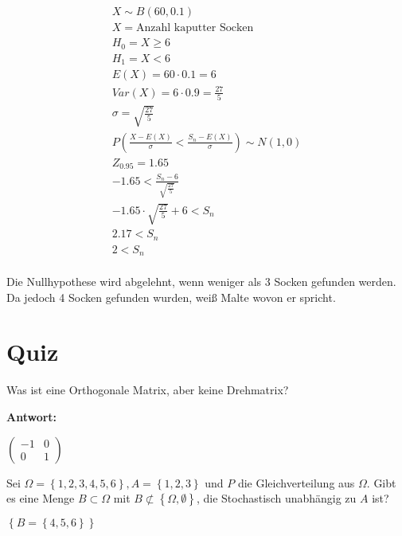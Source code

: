 \begin{align*}
    X \sim B(60, 0.1)                                                              \\
    X = \text{Anzahl kaputter Socken}                                              \\
    H_0 = X \geq 6                                                                 \\
    H_1 = X < 6                                                                    \\
    E(X) = 60 \cdot 0.1 = 6                                                        \\
    Var(X) = 6 \cdot 0.9 = \frac{27}{5}                                            \\
    \sigma = \sqrt{\frac{27}{5}}                                                   \\
    P\left(\frac{X - E(X)}{\sigma} < \frac{S_n - E(X)}{\sigma}\right) \sim N(1, 0) \\
    Z_{0.95} = 1.65                                                                \\
    -1.65 < \frac{S_n - 6}{\sqrt{\frac{27}{5}}}                                    \\
    -1.65 \cdot \sqrt{\frac{27}{5}} + 6 < S_n                                      \\
    2.17 < S_n                                                                     \\
    2 < S_n                                                                        \\
\end{align*}

Die Nullhypothese wird abgelehnt, wenn weniger als 3 Socken gefunden werden. Da
jedoch 4 Socken gefunden wurden, weiß Malte wovon er spricht.

\section{Quiz}

Was ist eine Orthogonale Matrix, aber keine Drehmatrix?

\textbf{Antwort:}

$\begin{pmatrix}
    -1 & 0 \\
    0 & 1
\end{pmatrix}$


Sei $\Omega = \left\{1, 2, 3, 4, 5, 6\right\}, A = \left\{1, 2, 3\right\}$ und
$P$ die Gleichverteilung aus $\Omega$. Gibt es eine Menge $B \subset \Omega$
mit $B \not \subset \left\{\Omega, \emptyset\right\}$, die Stochastisch
unabhängig zu $A$ ist?

$\left\{B = \left\{4 , 5, 6\right\}\right\}$